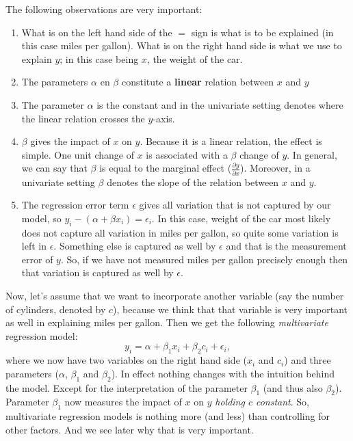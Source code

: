\documentclass[]{article}
\providecommand{\tightlist}{%
  \setlength{\itemsep}{0pt}\setlength{\parskip}{0pt}}
\theoremstyle{definition}
\theoremstyle{definition}
\theoremstyle{definition}
\theoremstyle{remark}
\begin{document}
The following observations are very important:

\begin{enumerate}
\def\labelenumi{\arabic{enumi}.}
\tightlist
\item
  What is on the left hand side of the \(=\) sign is what is to be
  explained (in this case miles per gallon). What is on the right hand
  side is what we use to explain \(y\); in this case being \(x\), the
  weight of the car.
\item
  The parameters \(\alpha\) en \(\beta\) constitute a \textbf{linear}
  relation between \(x\) and \(y\)
\item
  The parameter \(\alpha\) is the constant and in the univariate setting
  denotes where the linear relation crosses the \(y\)-axis.
\item
  \(\beta\) gives the impact of \(x\) on \(y\). Because it is a linear
  relation, the effect is simple. One unit change of \(x\) is associated
  with a \(\beta\) change of \(y\). In general, we can say that
  \(\beta\) is equal to the marginal effect
  (\(\frac{\partial y}{\partial x}\)). Moreover, in a univariate setting
  \(\beta\) denotes the slope of the relation between \(x\) and \(y\).
\item
  The regression error term \(\epsilon\) gives all variation that is not
  captured by our model, so \(y_i -(\alpha + \beta x_i) = \epsilon_i\).
  In this case, weight of the car most likely does not capture all
  variation in miles per gallon, so quite some variation is left in
  \(\epsilon\). Something else is captured as well by \(\epsilon\) and
  that is the measurement error of \(y\). So, if we have not measured
  miles per gallon precisely enough then that variation is captured as
  well by \(\epsilon\).
\end{enumerate}

Now, let's assume that we want to incorporate another variable (say the
number of cylinders, denoted by \(c\)), because we think that that
variable is very important as well in explaining miles per gallon. Then
we get the following \emph{multivariate} regression model: \[
y_i = \alpha + \beta_1 x_i + \beta_2 c_i + \epsilon_i,
\] where we now have two variables on the right hand side (\(x_i\) and
\(c_i\)) and three parameters (\(\alpha\), \(\beta_1\) and \(\beta_2\)).
In effect nothing changes with the intuition behind the model. Except
for the interpretation of the parameter \(\beta_1\) (and thus also
\(\beta_2\)). Parameter \(\beta_1\) now measures the impact of \(x\) on
\(y\) \emph{holding \(c\) constant}. So, multivariate regression models
is nothing more (and less) than controlling for other factors. And we
see later why that is very important.
\end{document}
